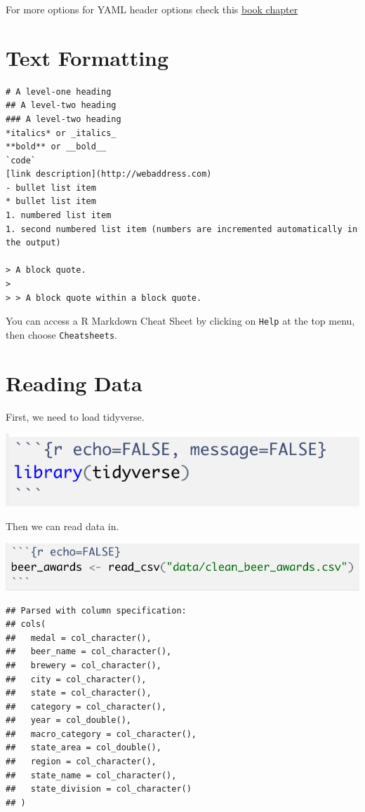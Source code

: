 \documentclass[
]{book}
\begin{document}
For more options for YAML header options check this \href{https://r4ds.had.co.nz/r-markdown.html\#yaml-header}{book chapter}

\hypertarget{text-formatting}{%
\section{Text Formatting}\label{text-formatting}}

\begin{verbatim}
# A level-one heading
## A level-two heading
### A level-two heading
*italics* or _italics_
**bold** or __bold__
`code`
[link description](http://webaddress.com)
- bullet list item
* bullet list item
1. numbered list item
1. second numbered list item (numbers are incremented automatically in the output)

> A block quote.
>
> > A block quote within a block quote.
\end{verbatim}

You can access a R Markdown Cheat Sheet by clicking on \texttt{Help} at the top menu, then choose \texttt{Cheatsheets}.

\hypertarget{reading-data}{%
\section{Reading Data}\label{reading-data}}

First, we need to load tidyverse.

\includegraphics[width=9.03in]{images/load_tidyverse}

Then we can read data in.

\includegraphics[width=13.67in]{images/read_beer_data}

\begin{verbatim}
## Parsed with column specification:
## cols(
##   medal = col_character(),
##   beer_name = col_character(),
##   brewery = col_character(),
##   city = col_character(),
##   state = col_character(),
##   category = col_character(),
##   year = col_double(),
##   macro_category = col_character(),
##   state_area = col_double(),
##   region = col_character(),
##   state_name = col_character(),
##   state_division = col_character()
## )
\end{verbatim}
\end{document}
